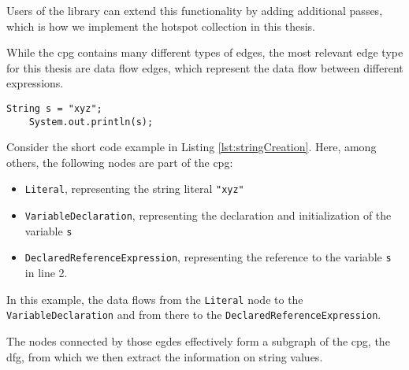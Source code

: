 Users of the library can extend this functionality by adding additional passes, which is how we implement the hotspot collection in this thesis.


While the \ac{cpg} contains many different types of edges, the most relevant edge type for this thesis are data flow edges, which represent the data flow between different expressions.

\begin{lstlisting}[label={lst:stringCreation}, caption={Example code}, captionpos=b]
	String s = "xyz";
	System.out.println(s);
\end{lstlisting}

Consider the short code example in Listing \ref{lst:stringCreation}. Here, among others, the following nodes are part of the \ac{cpg}:

\begin{itemize}
	\item \lstinline|Literal|, representing the string literal \lstinline{"xyz"}
	\item \lstinline|VariableDeclaration|, representing the declaration and initialization of the variable \lstinline|s|
	\item \lstinline|DeclaredReferenceExpression|, representing the reference to the variable \lstinline|s| in line 2.
\end{itemize}

In this example, the data flows from the \lstinline|Literal| node to the \lstinline|VariableDeclaration| and from there to the \lstinline|DeclaredReferenceExpression|.

The nodes connected by those egdes effectively form a subgraph of the \ac{cpg}, the \ac{dfg}, from which we then extract the information on string values.



